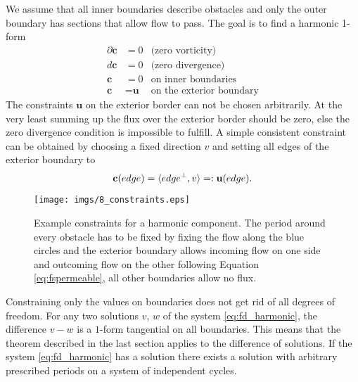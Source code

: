 We assume that all inner boundaries describe obstacles and only the outer boundary has sections that allow flow to pass. The goal is to find a harmonic 1-form
\begin{align}
\partial \textbf{c} &= 0 & \text{(zero vorticity)}\nonumber\\ 
d \textbf{c} &= 0 & \text{(zero divergence)}\nonumber\\
\textbf{c} &= 0 & \text{on inner boundaries}\nonumber\\
\textbf{c} &= \textbf{u} & \text{on the exterior boundary}
\label{eq:fd_harmonic}
\end{align}
The constraints $\textbf{u}$ on the exterior border can not be chosen arbitrarily. At the very least summing up the flux over the exterior border should be zero, else the zero divergence condition is impossible to fulfill. A simple consistent constraint can be obtained by choosing a fixed direction $v$ and setting all edges of the exterior boundary to
\begin{equation}\textbf{c}(edge) = \langle edge^\perp, v\rangle=: \textbf{u}(edge) \label{eq:fspermeable}.\end{equation}


\begin{figure}%
\begin{center}
\texttt{[image: imgs/8\_constraints.eps]}%
\end{center}
\caption{Example constraints for a harmonic component. The period around every obstacle has to be fixed by fixing the flow along the blue circles and the exterior boundary allows incoming flow on one side and outcoming flow on the other following Equation \ref{eq:fspermeable}, all other boundaries allow no flux.}%
\label{fig:fd_harmconstraints}%
\end{figure}


Constraining only the values on boundaries does not get rid of all degrees of freedom. For any two solutions $v$, $w$ of the system \ref{eq:fd_harmonic}, the difference $v-w$ is a $1$-form tangential on all boundaries. This means that the theorem described in the last section applies to the difference of solutions.  If the system \ref{eq:fd_harmonic} has a solution there exists a solution with arbitrary prescribed periods on a system of independent cycles. 

